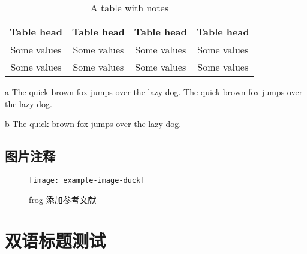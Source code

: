 \zhlipsum[2-3]


\begin{table}[h!]
	\caption{A table with notes}\label{tab:tablenotes}
	\centering
	\begin{threeparttable}
		\begin{tabular}{*4{c}}\toprule
			Table head\tnote{a} & Table head & Table head & Table head\tnote{b} \\ \midrule
			Some values & Some values & Some values & Some values \\
			Some values & Some values & Some values & Some values \\ \bottomrule
		\end{tabular}
		\begin{tablenotes}
			\footnotesize
			\item[a] The quick brown fox jumps over the lazy dog. The quick brown fox jumps over the lazy dog.
			\item[b] The quick brown fox jumps over the lazy dog.
		\end{tablenotes}
	\end{threeparttable}
\end{table}


\subsection{图片注释}
\zhlipsum[4]
\begin{figure}[h!]
	\centering                        
	\texttt{[image: example-image-duck]}
	\caption[frog]{frog \footnotemark 添加参考文献\cite{2003张量分析} }
	\label{fig:pic1}
\end{figure}





\section{双语标题测试}

